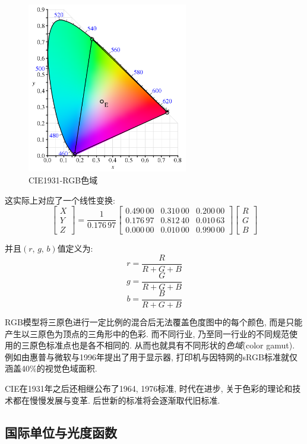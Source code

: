 \begin{figure}
\vspace{-0.4cm}
\centering
\includegraphics[width=7cm]{image/5-8-5.png}
\caption{CIE1931-RGB色域}\label{fig:rgbgamut}
\end{figure}
这实际上对应了一个线性变换:
\[{\displaystyle {\begin{bmatrix}X\\Y\\Z\end{bmatrix}}={\frac {1}{0.176\,97}}{\begin{bmatrix}0.490\,00&0.310\,00&0.200\,00\\0.176\,97&0.812\,40&0.010\,63\\0.000\,00&0.010\,00&0.990\,00\end{bmatrix}}{\begin{bmatrix}R\\G\\B\end{bmatrix}}}\]

并且$(r,\,g,\,b)$值定义为:
\[r=\frac{R}{R+G+B}\]
\[g=\frac{G}{R+G+B}\]
\[b=\frac{B}{R+G+B}\]

RGB模型将三原色进行一定比例的混合后无法覆盖色度图中的每个颜色, 而是只能产生以三原色为顶点的三角形中的色彩. 而不同行业, 乃至同一行业的不同规范使用的三原色标准点也是各不相同的. 从而也就具有不同形状的\emph{色域}(color gamut). 例如由惠普与微软与1996年提出了用于显示器, 打印机与因特网的sRGB标准就仅涵盖40\%的视觉色域面积.

CIE在1931年之后还相继公布了1964, 1976标准, 时代在进步, 关于色彩的理论和技术都在慢慢发展与变革. 后世新的标准将会逐渐取代旧标准.

\subsection{国际单位与光度函数}

